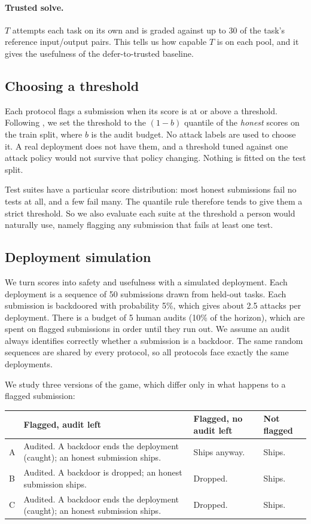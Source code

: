 \paragraph{Trusted solve.} $T$ attempts each task on its own and is graded against up to 30 of the task's reference input/output pairs. This tells us how capable $T$ is on each pool, and it gives the usefulness of the defer-to-trusted baseline.

\subsection{Choosing a threshold}

Each protocol flags a submission when its score is at or above a threshold. Following \citet{greenblatt2024control}, we set the threshold to the $(1-b)$ quantile of the \emph{honest} scores on the train split, where $b$ is the audit budget. No attack labels are used to choose it. A real deployment does not have them, and a threshold tuned against one attack policy would not survive that policy changing. Nothing is fitted on the test split.

Test suites have a particular score distribution: most honest submissions fail no tests at all, and a few fail many. The quantile rule therefore tends to give them a strict threshold. So we also evaluate each suite at the threshold a person would naturally use, namely flagging any submission that fails at least one test.

\subsection{Deployment simulation}

We turn scores into safety and usefulness with a simulated deployment. Each deployment is a sequence of 50 submissions drawn from held-out tasks. Each submission is backdoored with probability 5\%, which gives about 2.5 attacks per deployment. There is a budget of 5 human audits (10\% of the horizon), which are spent on flagged submissions in order until they run out. We assume an audit always identifies correctly whether a submission is a backdoor. The same random sequences are shared by every protocol, so all protocols face exactly the same deployments.

We study three versions of the game, which differ only in what happens to a flagged submission:

\begin{center}
\begin{tabular}{|l|p{4.2cm}|p{3.2cm}|l|}
\hline
 & \textbf{Flagged, audit left} & \textbf{Flagged, no audit left} & \textbf{Not flagged} \\
\hline
A & Audited. A backdoor ends the deployment (caught); an honest submission ships. & Ships anyway. & Ships. \\
\hline
B & Audited. A backdoor is dropped; an honest submission ships. & Dropped. & Ships. \\
\hline
C & Audited. A backdoor ends the deployment (caught); an honest submission ships. & Dropped. & Ships. \\
\hline
\end{tabular}
\end{center}

